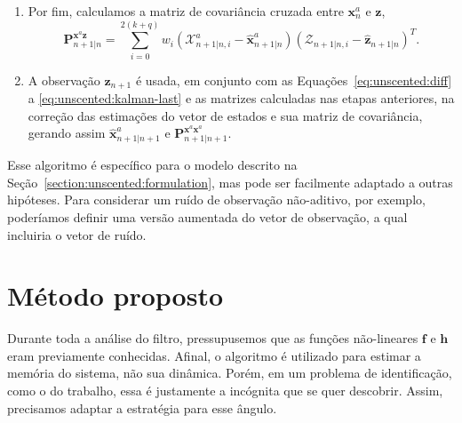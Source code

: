\begin{enumerate}
	\item Por fim, calculamos a matriz de covariância cruzada entre $\mathbf{x}_n^a$ e
	      $\mathbf{z}$,
	      \begin{equation}
		      \mathbf{P}^{\mathbf{x}^a\mathbf{z}}_{n+1|n} = \sum_{i=0}^{2(k+q)} w_i (\bm{\mathcal{X}}_{n+1|n,i}^a - \hat{\mathbf{x}}_{n+1|n}^a) (\bm{\mathcal{Z}}_{n+1|n,i} - \hat{\mathbf{z}}_{n+1|n})^T.
	      \end{equation}

	\item A observação $\mathbf{z}_{n+1}$ é usada, em conjunto com as
	      Equações~\eqref{eq:unscented:diff} a \eqref{eq:unscented:kalman-last} e as matrizes
	      calculadas nas etapas anteriores, na correção das estimações do vetor de estados e sua
	      matriz de covariância, gerando assim $\hat{\mathbf{x}}_{n+1|n+1}^a$ e
	      $\mathbf{P}^{\mathbf{x}^a\mathbf{x}^a}_{n+1|n+1}$.
\end{enumerate}

Esse algoritmo é específico para o modelo descrito na
Seção~\ref{section:unscented:formulation}, mas pode ser facilmente adaptado a outras
hipóteses. Para considerar um ruído de observação não-aditivo, por exemplo, poderíamos
definir uma versão aumentada do vetor de observação, a qual incluiria o vetor de ruído.

\section{Método proposto}
\label{section:unscented:model}

Durante toda a análise do filtro, pressupusemos que as funções não-lineares
$\mathbf{f}$ e $\mathbf{h}$ eram previamente conhecidas. Afinal, o algoritmo é
utilizado para estimar a memória do sistema, não sua dinâmica. Porém, em um problema de
identificação, como o do trabalho, essa é justamente a incógnita que se quer descobrir.
Assim, precisamos adaptar a estratégia para esse ângulo.

